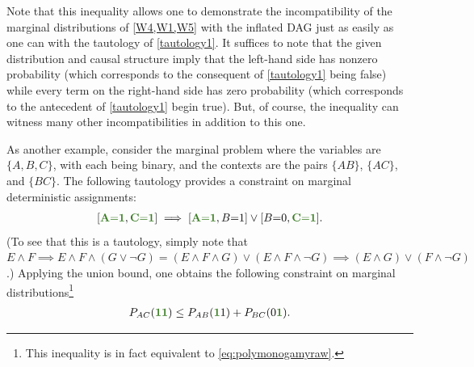 {Note that this inequality allows one to demonstrate the incompatibility of the marginal distributions of \cref{W4,W1,W5} with the inflated DAG just as easily as one can with the tautology of \cref{tautology1}.  It suffices to note that the given distribution and causal structure imply that the left-hand side has nonzero probability (which corresponds to the consequent of \cref{tautology1} being false) while every term on the right-hand side has zero probability (which corresponds to the antecedent of  \cref{tautology1} begin true).
But, of course, the inequality can witness many other incompatibilities in addition to this one.


As another example, consider the marginal problem where the variables are $\{ A,B,C\}$, with each being binary, and the contexts are the pairs $\{AB\}$, $\{AC\}$, and $\{BC\}$.  
The following tautology provides a constraint on marginal deterministic assignments:
\begin{align}
 \bracks{\mgreen{A \eql 1}, \mgreen{C \eql 1}} \implies \bracks{\mgreen{A \eql 1}, B \eql 1} \lor \bracks{B \eql 0, \mgreen{C \eql 1}}.
\end{align}
(To see that this is a tautology, simply note that $E \land F  \implies  E \land F \land (G \lor \lnot G) = (E \land F \land G) \lor (E\land F \land \lnot G) \implies (E \land G) \lor (F \land \lnot G)$.) 
Applying the union bound, one obtains the following constraint on marginal distributions\footnote{This inequality is in fact equivalent to \cref{eq:polymonogamyraw}.}
\begin{align}\label{eq:trivmarginalconstraint}
	P_{AC}(\mgreen{1 1}) \leq P_{AB}(\mgreen{1} 1) + P_{BC}(0 \mgreen{1}).
\end{align}


}
